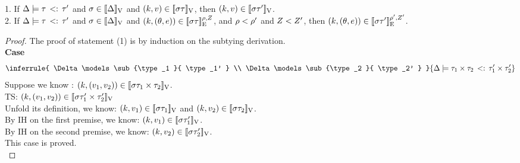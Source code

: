 \begin{lem}\label{lem:sub_sound}  \\
1. If $ \Delta \models  \tau  \, <: \,  \tau'  $ and $ \sigma \in [\![ \Delta ]\!]_{\text{V}}$ and  $(k, v) \in [\![ \sigma \tau ]\!]_{\text{V}}$,  then  $(k, v) \in [\![ \sigma \tau' ]\!]_{\text{V}}$.
  \\
 2. If $ \Delta \models  \tau  \, <: \,  \tau'  $ and $ \sigma \in
 [\![ \Delta ]\!]_{\text{V}}$ and  $(k, (\theta, e)) \in
 [\![ \sigma \tau ]\!]_{\text{E}}^{\rho, Z}$, and $\rho < \rho'$ and $Z < Z' $,  then  $(k, (\theta, e)) \in [\![ \sigma \tau' ]\!]_{\text{E}}^{\rho', Z'}$.
   \\
\end{lem}
%
\begin{proof} The proof of statement (1) is by induction on the
  subtying derivation.\\

\textbf{Case}
\[ 
 \inferrule{
     \Delta \models \sub{\type_1 }{ \type_1'  } \\
         \Delta \models \sub{\type_2 }{ \type_2'  }
    }{
       \Delta \models \sub{\type_1 \times \type_2 }{ \type_1' \times \type_2'  }
    }
\]
Suppose we know : $ (k, (v_1, v_2)) \in [\![ \sigma \tau_1 \times \tau_2 ]\!]_{\text{V}} $.\\
TS:  $ (k, (v_1, v_2)) \in [\![ \sigma \tau_1' \times \tau_2' ]\!]_{\text{V}} $ \\
Unfold its definition, we know: $  (k, v_1 ) \in [\![ \sigma \tau_1 ]\!]_{\text{V}} $ and $  (k, v_2 ) \in [\![ \sigma \tau_2 ]\!]_{\text{V}} $.\\
By IH on the first premise, we know: $  (k, v_1 ) \in [\![ \sigma \tau_1' ]\!]_{\text{V}} $.\\
By IH on the second premise, we know: $  (k, v_2 ) \in [\![ \sigma \tau_2' ]\!]_{\text{V}} $.\\
This case is proved.\\


\end{proof}
